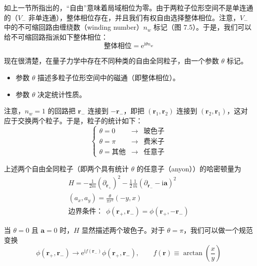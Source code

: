 如上一节所指出的，“自由”意味着局域相位为零。由于两粒子位形空间不是单连通的（$V_-$ 非单连通），整体相位存在，并且我们有权自由选择整体相位。注意，$V_-$ 中的不可缩回路由缠绕数（winding number）$n_w$ 标记（图 7.5）。于是，我们可以给不可缩回路指派如下整体相位：
\begin{equation*}
\text{整体相位} = \mathrm{e}^{\mathrm{i}\theta n_w}
\end{equation*}

现在很清楚，在量子力学中存在不同种类的自由全同粒子，由一个参数 $\theta$ 标记。


\begin{itemize}
\item 参数 $\theta$ 描述多粒子位形空间中的磁通（即整体相位）。
\item 参数 $\theta$ 决定统计性质。
\end{itemize}

注意，$n_w=1$ 的回路把 $\pmb{r}_-$ 连接到 $-\pmb{r}_-$，即把 $(\pmb{r}_1,\pmb{r}_2)$ 连接到 $(\pmb{r}_2,\pmb{r}_1)$，这对应于交换两个粒子。于是，粒子的统计如下：
\begin{equation*}
\left\{\begin{array}{ccc}
\theta = 0 & \rightarrow & \text{玻色子}\\
\theta = \pi & \rightarrow & \text{费米子}\\
\theta = \text{其他} & \rightarrow & \text{任意子}
\end{array}\right.
\end{equation*}

上述两个自由全同粒子（即两个具有统计 $\theta$ 的任意子（anyon））的哈密顿量为
\begin{gather*}
H = -\frac{1}{2m}(\partial_{\pmb{r}_+})^2 - \frac{1}{2}\frac{1}{m}(\partial_{\pmb{r}_-}-\mathrm{i}\pmb{a})^2\\
(a_x, a_y) = \frac{\theta}{\pi r^2}(-y, x) \tag{7.1.1}\\
\text{边界条件：}\ \ \phi(\pmb{r}_+,\pmb{r}_-) = \phi(\pmb{r}_+,-\pmb{r}_-)
\end{gather*}

当 $\theta=0$ 且 $\pmb{a}=0$ 时，$H$ 显然描述两个玻色子。对于 $\theta=\pi$，我们可以做一个规范变换
\begin{equation*}
\phi(\pmb{r}_+,\pmb{r}_-) \rightarrow \mathrm{e}^{\mathrm{i}f(\pmb{r}_-)}\phi(\pmb{r}_+,\pmb{r}_-), \qquad f(\pmb{r}) \equiv \arctan\left(\frac{x}{y}\right)
\end{equation*}


